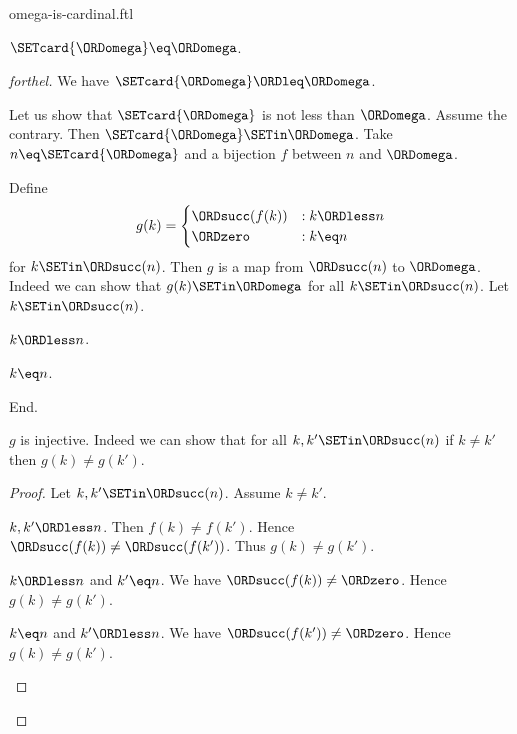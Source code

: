 \documentclass{naproche-library}
\begin{document}
\begin{smodule}[title=$\omega$ is a Cardinal Number]{omega-is-cardinal.ftl}

\begin{proposition}[forthel,id=SET_THEORY_07_4952029518626816]
  $\SETcard{\ORDomega} \eq \ORDomega$.
\end{proposition}
\begin{proof}[forthel]
  We have $\SETcard{\ORDomega} \ORDleq \ORDomega$.

  Let us show that $\SETcard{\ORDomega}$ is not less than $\ORDomega$.
    Assume the contrary.
    Then $\SETcard{\ORDomega} \SETin \ORDomega$.
    Take $n \eq \SETcard{\ORDomega}$ and a bijection $f$ between $n$ and $\ORDomega$.

    Define \[ g(k) =
      \begin{cases}
        \ORDsucc(f(k)) & : k \ORDless n
        \\
        \ORDzero           & : k \eq n
      \end{cases} \]
    for $k \SETin \ORDsucc(n)$.
    Then $g$ is a map from $\ORDsucc(n)$ to $\ORDomega$.
    Indeed we can show that $g(k) \SETin \ORDomega$ for all $k \SETin \ORDsucc(n)$.
      Let $k \SETin \ORDsucc(n)$.
      \begin{case}{$k \ORDless n$.} \end{case}
      \begin{case}{$k \eq n$.} \end{case}
    End.

    $g$ is injective.
    Indeed we can show that for all $k, k' \SETin \ORDsucc(n)$ if $k \neq k'$
    then $g(k) \neq g(k')$. 
    \begin{proof}
      Let $k, k' \SETin \ORDsucc(n)$.
      Assume $k \neq k'$.

      \begin{case}{$k, k' \ORDless n$.}
        Then $f(k) \neq f(k')$.
        Hence $\ORDsucc(f(k)) \neq \ORDsucc(f(k'))$.
        Thus $g(k) \neq g(k')$.
      \end{case}

      \begin{case}{$k \ORDless n$ and $k' \eq n$.}
        We have $\ORDsucc(f(k)) \neq \ORDzero$.
        Hence $g(k) \neq g(k')$.
      \end{case}

      \begin{case}{$k \eq n$ and $k' \ORDless n$.}
        We have $\ORDsucc(f(k')) \neq \ORDzero$.
        Hence $g(k) \neq g(k')$.
      \end{case}
    \end{proof}


\end{proof}
\end{smodule}
\end{document}

